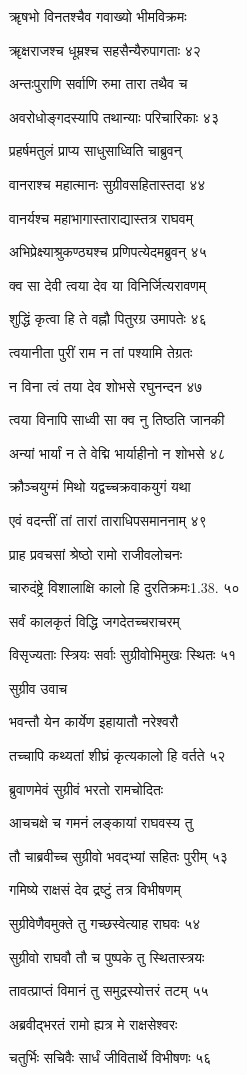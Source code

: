 ॠषभो विनतश्चैव गवाख्यो भीमविक्रमः

ॠक्षराजश्च धूम्रश्च सहसैन्यैरुपागताः ४२

अन्तःपुराणि सर्वाणि रुमा तारा तथैव च

अवरोधोङ्गदस्यापि तथान्याः परिचारिकाः ४३

प्रहर्षमतुलं प्राप्य साधुसाध्विति चाब्रुवन्

वानराश्च महात्मानः सुग्रीवसहितास्तदा ४४

वानर्यश्च महाभागास्ताराद्यास्तत्र राघवम्

अभिप्रेक्ष्याश्रुकण्ठ्यश्च प्रणिपत्येदमब्रुवन् ४५

क्व सा देवी त्वया देव या विनिर्जित्यरावणम्

शुद्धिं कृत्वा हि ते वह्नौ पितुरग्र उमापतेः ४६

त्वयानीता पुरीं राम न तां पश्यामि तेग्रतः

न विना त्वं तया देव शोभसे रघुनन्दन ४७

त्वया विनापि साध्वी सा क्व नु तिष्ठति जानकी

अन्यां भार्यां न ते वेद्मि भार्याहीनो न शोभसे ४८

क्रौञ्चयुग्मं मिथो यद्वच्चक्रवाकयुगं यथा

एवं वदन्तीं तां तारां ताराधिपसमाननाम् ४९

प्राह प्रवचसां श्रेष्ठो रामो राजीवलोचनः

चारुदंष्ट्रे विशालाक्षि कालो हि दुरतिक्रमः1.38. ५०

सर्वं कालकृतं विद्धि जगदेतच्चराचरम्

विसृज्यताः स्त्रियः सर्वाः सुग्रीवोभिमुखः स्थितः ५१

सुग्रीव उवाच

भवन्तौ येन कार्येण इहायातौ नरेश्वरौ

तच्चापि कथ्यतां शीघ्रं कृत्यकालो हि वर्तते ५२

ब्रुवाणमेवं सुग्रीवं भरतो रामचोदितः

आचचक्षे च गमनं लङ्कायां राघवस्य तु

तौ चाब्रवीच्च सुग्रीवो भवद्भ्यां सहितः पुरीम् ५३

गमिष्ये राक्षसं देव द्रष्टुं तत्र विभीषणम्

सुग्रीवेणैवमुक्ते तु गच्छस्वेत्याह राघवः ५४

सुग्रीवो राघवौ तौ च पुष्पके तु स्थितास्त्रयः

तावत्प्राप्तं विमानं तु समुद्रस्योत्तरं तटम् ५५

अब्रवीद्भरतं रामो ह्यत्र मे राक्षसेश्वरः

चतुर्भिः सचिवैः सार्धं जीवितार्थे विभीषणः ५६


